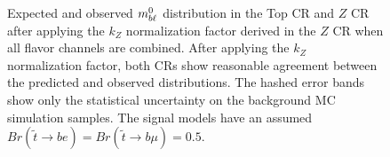 \begin{figure}
  \centering
  \caption{Expected and observed $m_{b\ell}^0$ distribution in the Top CR and
    $Z$ CR after applying the $k_Z$ normalization factor derived in the $Z$ CR
    when all flavor channels are combined.
    After applying the $k_Z$ normalization factor, both CRs show reasonable
    agreement between the predicted and observed distributions.
    The hashed error bands show only the statistical uncertainty on the
    background MC simulation samples.
    The signal models have an assumed
    $Br(\tilde{t}\rightarrow be) = Br(\tilde{t}\rightarrow b\mu) = 0.5$.
  }
  \label{fig:cr_mbl_0__w_norm_factor}
\end{figure}

